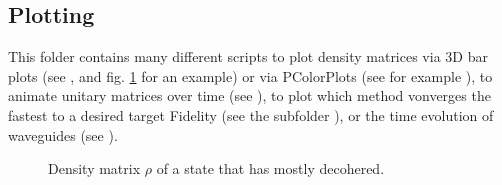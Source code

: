 \subsection{Plotting}
This folder contains many different scripts to plot density matrices via 3D bar plots (see , and fig. \ref{fig:cz_markov} for an example) or via PColorPlots (see for example ), to animate unitary matrices over time (see ), to plot which method vonverges the fastest to a desired target Fidelity (see the subfolder ), or the time evolution of waveguides (see ).

\begin{figure}[htb]
 \centering
  \hspace{0.2cm}
  \caption{\label{fig:cz_markov} Density matrix $\rho$ of a state that has mostly decohered. }
\end{figure}
 


